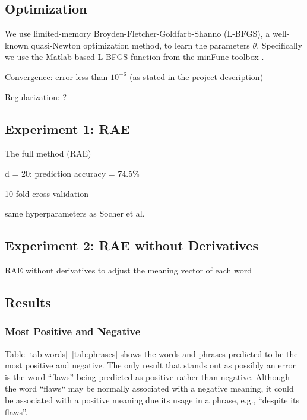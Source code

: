 \documentclass{article}
\begin{document}
%
%
\subsection{Optimization}
We use limited-memory Broyden-Fletcher-Goldfarb-Shanno (L-BFGS), a well-known quasi-Newton optimization method, to learn the parameters $\theta$. Specifically we use the Matlab-based L-BFGS function from the minFunc toolbox \cite{minFunc}.



Convergence: error less than $10^{-6}$ (as stated in the project description)

Regularization: ?


%
%
\subsection{Experiment 1: RAE}
The full method (RAE)

d = 20: prediction accuracy = 74.5\%

10-fold cross validation

same hyperparameters as Socher et al.


%
%
\subsection{Experiment 2: RAE without Derivatives}
RAE without derivatives to adjust the meaning vector of each word



%
%
\subsection{Results}

\subsubsection{Most Positive and Negative}
Table \ref{tab:words}--\ref{tab:phrases} shows the words and phrases predicted to be the most positive and negative. The only result that stands out as possibly an error is the word ``flaws'' being predicted as positive rather than negative. Although the word ``flaws`` may be normally associated with a negative meaning, it could be associated with a positive meaning due its usage in a phrase, e.g., ``despite its flaws''.
\end{document}
